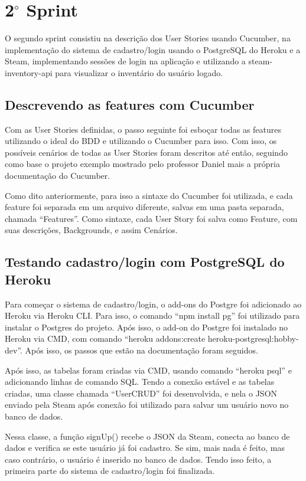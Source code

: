 \section{2$^{\circ}$ Sprint}
O segundo sprint consistiu na descrição dos User Stories usando Cucumber, na implementação do sistema de cadastro/login usando o PostgreSQL do Heroku e a Steam, implementando sessões de login na aplicação e utilizando a steam-inventory-api para visualizar o inventário do usuário logado.

\subsection{Descrevendo as features com Cucumber}
Com as User Stories definidas, o passo seguinte foi esboçar todas as features utilizando o ideal do BDD 
e utilizando o Cucumber para isso. Com isso, os possíveis cenários de todas as User Stories foram descritos até então, seguindo como base o projeto exemplo mostrado pelo professor Daniel mais a própria documentação do Cucumber.

Como dito anteriormente, para isso a sintaxe do Cucumber foi utilizada, e cada feature foi separada em um arquivo diferente, 
salvas em uma pasta separada, chamada ``Features''. 
Como sintaxe, cada User Story foi salva como Feature, com suas descrições, Backgrounds, e assim Cenários.

\subsection{Testando cadastro/login com PostgreSQL do Heroku}
Para começar o sistema de cadastro/login, o add-ons do Postgre foi adicionado ao Heroku via Heroku CLI. Para isso, 
o comando ``npm install pg'' foi utilizado para instalar o Postgres do projeto. Após isso, o add-on do Postgre foi instalado no
Heroku via CMD, com comando ``heroku addons:create heroku-postgresql:hobby-dev''. Após isso, os passos 
que estão na documentação  foram seguidos.

Após isso, as tabelas foram criadas via CMD, usando comando ``heroku psql'' e adicionando linhas de comando SQL.
Tendo a conexão estável e as tabelas criadas, uma classe chamada ``UserCRUD'' foi desenvolvida, e nela o JSON 
enviado pela Steam após conexão foi utilizado para salvar um usuário novo no banco de dados.

Nessa classe, a função signUp() recebe o JSON da Steam, conecta ao banco de dados e verifica se este usuário 
já foi cadastro. Se sim, mais nada é feito, mas caso contrário, o usuário é inserido no banco de dados.
Tendo isso feito, a primeira parte do sistema de cadastro/login foi finalizada.

